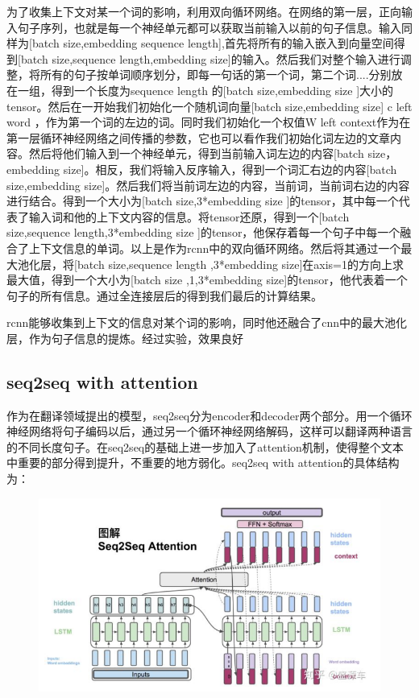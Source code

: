 \documentclass{article}
\begin{document}
为了收集上下文对某一个词的影响，利用双向循环网络。在网络的第一层，正向输入句子序列，也就是每一个神经单元都可以获取当前输入以前的句子信息。输入同样为[batch size,embedding sequence length],首先将所有的输入嵌入到向量空间得到[batch size,sequence length,embedding size]的输入。然后我们对整个输入进行调整，将所有的句子按单词顺序划分，即每一句话的第一个词，第二个词....分别放在一组，得到一个长度为sequence length 的[batch size,embedding size ]大小的tensor。然后在一开始我们初始化一个随机词向量[batch size,embedding size] c left word ，作为第一个词的左边的词。同时我们初始化一个权值W left context作为在第一层循环神经网络之间传播的参数，它也可以看作我们初始化词左边的文章内容。然后将他们输入到一个神经单元，得到当前输入词左边的内容[batch size，embedding size]。相反，我们将输入反序输入，得到一个词汇右边的内容[batch size,embedding size]。然后我们将当前词左边的内容，当前词，当前词右边的内容进行结合。得到一个大小为[batch size,3*embedding size ]的tensor，其中每一个代表了输入词和他的上下文内容的信息。将tensor还原，得到一个[batch size,sequence length,3*embedding size ]的tensor，他保存着每一个句子中每一个融合了上下文信息的单词。以上是作为rcnn中的双向循环网络。然后将其通过一个最大池化层，将[batch size,sequence length ,3*embedding size]在axis=1的方向上求最大值，得到一个大小为[batch size ,1,3*embedding size]的tensor，他代表着一个句子的所有信息。通过全连接层后的得到我们最后的计算结果。

rcnn能够收集到上下文的信息对某个词的影响，同时他还融合了cnn中的最大池化层，作为句子信息的提炼。经过实验，效果良好



\subsection{seq2seq with attention}

作为在翻译领域提出的模型，seq2seq分为encoder和decoder两个部分。用一个循环神经网络将句子编码以后，通过另一个循环神经网络解码，这样可以翻译两种语言的不同长度句子。在seq2seq的基础上进一步加入了attention机制，使得整个文本中重要的部分得到提升，不重要的地方弱化。seq2seq with attention的具体结构为：

\begin{figure}
\centering
\includegraphics[width=.8\textwidth]{seq2seqattention.png}
\end{figure}
\end{document}
